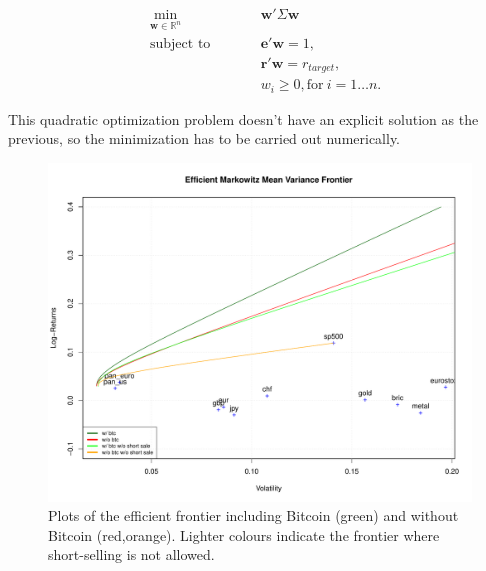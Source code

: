 \documentclass[12pt]{elsarticle}
\begin{document}
\begin{subequations}
\begin{align}
&\!\min_{\mathbf{w}\in \mathbb{R}^{n}}        &\qquad& \mathbf{w} ' \Sigma \mathbf{w} \\
& \text{subject to} &      & \mathbf{e}'\mathbf{w} = 1 ,\label{eq:constraint1}\\
&                  &      & \mathbf{r}'\mathbf{w} = r_{target},\label{eq:constraint2}\\
&		 &        & w_{i} \geq 0, \text{for} \: i = 1\dots n.
\end{align}
\end{subequations}

This quadratic optimization problem doesn't have an explicit solution as the previous, so the minimization has to be carried out numerically.

\begin{figure}[h]
\includegraphics[width=\textwidth]{frontier_markowitz_all.pdf}
\caption{Plots of the efficient frontier including Bitcoin (green) and without Bitcoin (red,orange). Lighter colours indicate the frontier where short-selling is not allowed.}
\end{figure}
\end{document}
